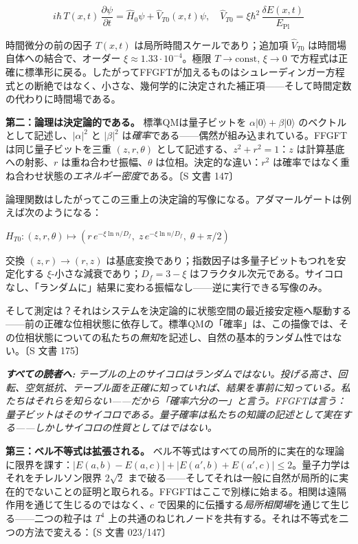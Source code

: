 \documentclass[11pt,openany]{book}
\newenvironment{laierspur}{%
  \par\vspace{4pt}%
  \noindent\small\itshape\color{blue!60!black}%
  \textbf{すべての読者へ:}\enspace\ignorespaces}{%
  \par\vspace{4pt}\normalsize\normalfont\normalcolor}
\begin{document}
\[i\hbar\, T(x,t)\,\frac{\partial\psi}{\partial t} = \hat{H}_0\psi + \hat{V}_{T0}(x,t)\psi, \quad \hat{V}_{T0} = \xi\hbar^2\,\frac{\delta E(x,t)}{E_\text{Pl}}\]

時間微分の前の因子 $T(x,t)$ は局所時間スケールであり；追加項 $\hat{V}_{T0}$ は時間場自体への結合で、オーダー $\xi \approx 1.33\cdot 10^{-4}$。極限 $T \to \mathrm{const}$, $\xi \to 0$ で方程式は正確に標準形に戻る。したがってFFGFTが加えるものはシュレーディンガー方程式との断絶ではなく、小さな、幾何学的に決定された補正項——そして時間定数の代わりに時間場である。

\textbf{第二：論理は決定論的である。}
標準QMは量子ビットを $\alpha|0\rangle+\beta|0\rangle$ のベクトルとして記述し、$|\alpha|^2$ と $|\beta|^2$ は\textit{確率}である——偶然が組み込まれている。FFGFTは同じ量子ビットを三重 $(z, r, \theta)$ として記述する、$z^2 + r^2 = 1$：$z$ は計算基底への射影、$r$ は重ね合わせ振幅、$\theta$ は位相。決定的な違い：$r^2$ は確率ではなく重ね合わせ状態の\textit{エネルギー密度}である。〔S 文書 147〕

論理関数はしたがってこの三重上の決定論的写像になる。アダマールゲートは例えば次のようになる：

$H_{T0}: (z,r,\theta) \mapsto (r\,e^{-\xi\ln n/D_f},\; z\,e^{-\xi\ln n/D_f},\; \theta+\pi/2)$

交換 $(z,r)\to(r,z)$ は基底変換であり；指数因子は多量子ビットもつれを安定化する $\xi$-小さな減衰であり；$D_f = 3-\xi$ はフラクタル次元である。サイコロなし、「ランダムに」結果に変わる振幅なし——逆に実行できる写像のみ。

そして測定は？それはシステムを決定論的に状態空間の最近接安定極へ駆動する——前の正確な位相状態に依存して。標準QMの「確率」は、この描像では、その位相状態についての私たちの\textit{無知}を記述し、自然の基本的ランダム性ではない。〔S 文書 175〕

\begin{laierspur}
テーブルの上のサイコロはランダムではない。投げる高さ、回転、空気抵抗、テーブル面を正確に知っていれば、結果を事前に知っている。私たちはそれらを知らない——だから「確率六分の一」と言う。FFGFTは言う：量子ビットはそのサイコロである。量子確率は私たちの知識の記述として実在する——しかしサイコロの性質としてはではない。
\end{laierspur}

\textbf{第三：ベル不等式は拡張される。}
ベル不等式はすべての局所的に実在的な理論に限界を課す：$|E(a,b)-E(a,c)| + |E(a',b)+E(a',c)| \leq 2$。量子力学はそれをチレルソン限界 $2\sqrt{2}$ まで破る——そしてそれは一般に自然が局所的に実在的でないことの証明と取られる。FFGFTはここで別様に始まる。相関は遠隔作用を通じて生じるのではなく、$c$ で因果的に伝播する\textit{局所相関場}を通じて生じる——二つの粒子は $T^4$ 上の共通のねじれノードを共有する。それは不等式を二つの方法で変える：〔S 文書 023/147〕
\end{document}
